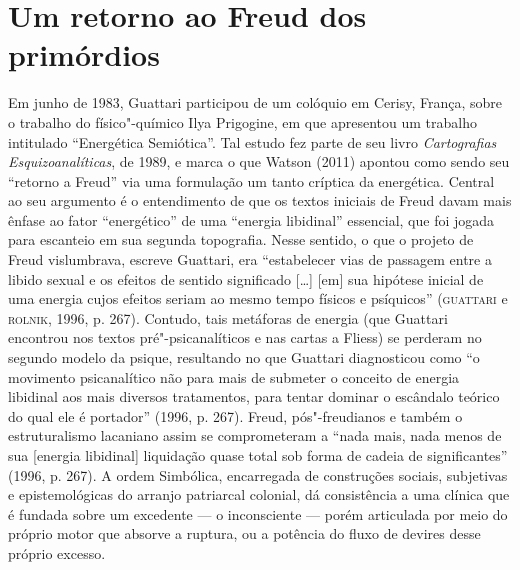 \section{Um retorno ao Freud dos primórdios}

Em junho de 1983, Guattari participou de um colóquio em Cerisy, França,
sobre o trabalho do físico"-químico Ilya Prigogine, em que apresentou um
trabalho intitulado ``Energética Semiótica''. Tal estudo fez parte de
seu livro \emph{Cartografias Esquizoanalíticas}, de 1989, e marca o que
Watson (2011) apontou como sendo seu ``retorno a Freud'' via uma
formulação um tanto críptica da energética. Central ao seu argumento é o
entendimento de que os textos iniciais de Freud davam mais ênfase ao
fator ``energético'' de uma ``energia libidinal'' essencial, que foi
jogada para escanteio em sua segunda topografia. Nesse sentido, o que o
projeto de Freud vislumbrava, escreve Guattari, era ``estabelecer vias
de passagem entre a libido sexual e os efeitos de sentido significado
{[}\ldots{}{]} {[}em{]} sua hipótese inicial de uma energia cujos
efeitos seriam ao mesmo tempo físicos e psíquicos'' (\textsc{guattari} e \textsc{rolnik},
1996, p. 267). Contudo, tais metáforas de energia (que Guattari
encontrou nos textos pré"-psicanalíticos e nas cartas a Fliess) se
perderam no segundo modelo da psique, resultando no que Guattari
diagnosticou como ``o movimento psicanalítico não para mais de submeter
o conceito de energia libidinal aos mais diversos tratamentos, para
tentar dominar o escândalo teórico do qual ele é portador'' (1996, p. 267). Freud, pós"-freudianos e também o estruturalismo
lacaniano assim se comprometeram a ``nada mais, nada menos de sua
{[}energia libidinal{]} liquidação quase total sob forma de cadeia de
significantes'' (1996, p. 267). A ordem Simbólica,
encarregada de construções sociais, subjetivas e epistemológicas do
arranjo patriarcal colonial, dá consistência a uma clínica que é fundada
sobre um excedente --- o inconsciente --- porém articulada por meio do
próprio motor que absorve a ruptura, ou a potência do fluxo de devires
desse próprio excesso.


